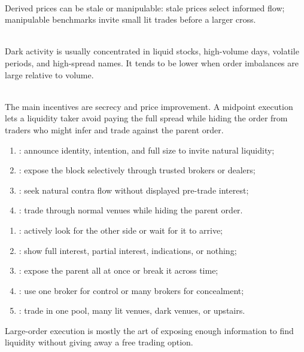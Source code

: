 \begin{caveat} \\
Derived prices can be stale or manipulable: stale prices select informed flow; manipulable benchmarks invite small lit trades before a larger cross.
\end{caveat}

\begin{empiricalfinding} \\
Dark activity is usually concentrated in liquid stocks, high-volume days, volatile periods, and high-spread names. It tends to be lower when order imbalances are large relative to volume.
\end{empiricalfinding}

\begin{mechanism} \\
The main incentives are secrecy and price improvement. A midpoint execution lets a liquidity taker avoid paying the full spread while hiding the order from traders who might infer and trade against the parent order.
\end{mechanism}

\begin{taxonomy} 
\begin{enumerate}[label=\roman*.]
\setlength{\itemsep}{0pt}
\item {}: announce identity, intention, and full size to invite natural liquidity;
\item {}: expose the block selectively through trusted brokers or dealers;
\item {}: seek natural contra flow without displayed pre-trade interest;
\item {}: trade through normal venues while hiding the parent order.
\end{enumerate}
\end{taxonomy}

\begin{taxonomy} 
\begin{enumerate}[label=\roman*.]
\setlength{\itemsep}{0pt}
\item {}: actively look for the other side or wait for it to arrive;
\item {}: show full interest, partial interest, indications, or nothing;
\item {}: expose the parent all at once or break it across time;
\item {}: use one broker for control or many brokers for concealment;
\item {}: trade in one pool, many lit venues, dark venues, or upstairs.
\end{enumerate}
Large-order execution is mostly the art of exposing enough information to find liquidity without giving away a free trading option.
\end{taxonomy}

